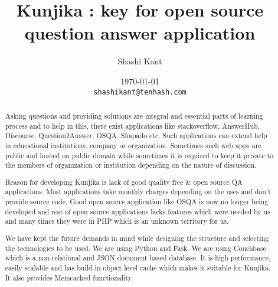 \documentclass[a4paper,10pt]{report}
\title{Kunjika : key for open source question answer application}
\author{Shashi Kant}
\date{\today \\ \texttt{shashikant@tenhash.com}}
\begin{document}
\maketitle
\begin{abstract}
Asking questions and providing solutions are integral and essential parts of learning process and to help in this, there exist applications like stackoverflow, AnswerHub, Discourse, Question2Answer, OSQA, Shapado etc. Such applications can extend help in educational institutions, company or organization. Sometimes such web apps are public and hosted on public domain while sometimes it is required to keep it private to the members of organization or institution depending on the nature of discussion.

Reason for developing Kunjika is lack of good quality free \& open source QA applications. Most applications take monthly charges depending on the uses and don't provide source code. Good open source application like OSQA is now no longer being developed and rest of open source applications lacks features which were needed by us and many times they were in PHP which is an unknown territory for us.

We have kept the future demands in mind while designing the structure and selecting the technologies to be used. We are  using Python and Fask.  We are using Couchbase which is a non-relational and JSON document based database. It is high performance, easily scalable and has build-in object level cache which makes it suitable for Kunjika. It also provides Memcached functionality.
\end{abstract}
\end{document}
